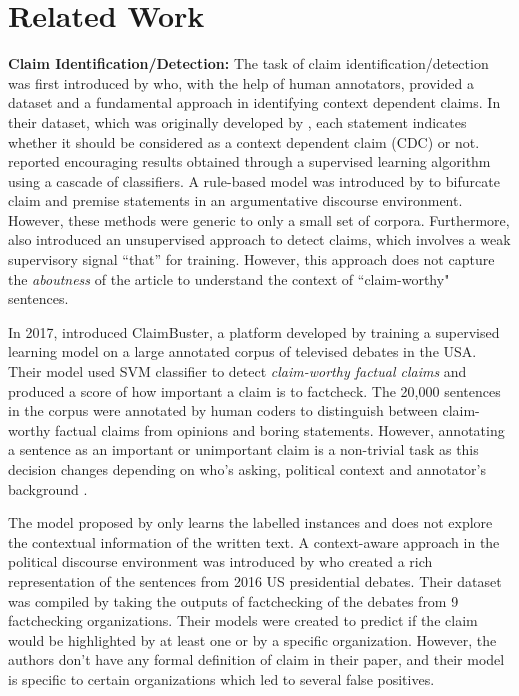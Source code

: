 \documentclass[11pt,a4paper]{article}
\begin{document}
 












\section{Related Work}
\label{sec:related}
{\textbf{Claim Identification/Detection:} The task of claim identification/detection was first introduced by \citet{levy_context_2014} who, with the help of human annotators, provided a dataset and a fundamental approach in identifying context dependent claims. In their dataset, which was originally developed by \citet{aharoni_benchmark_2014}, each statement indicates whether it should be considered as a context dependent claim (CDC) or not. \citet{levy_context_2014} reported encouraging results obtained through a supervised learning algorithm using a cascade of classifiers. A rule-based model was introduced by \citet{eckle-kohler_role_2015} to bifurcate claim and premise statements in an argumentative discourse environment. However, these methods were generic to only a small set of corpora. Furthermore, \citet{levy_unsupervised_2017} also introduced an unsupervised approach to detect claims, which involves a weak supervisory signal ``that'' for training. However, this approach does not capture the \textit{aboutness} of the article to understand the context of ``claim-worthy" sentences.
}

{
In 2017, \citet{hassan2017toward} introduced ClaimBuster, a platform developed by training a supervised learning model on a large annotated corpus of televised debates in the USA. Their model used SVM classifier to detect \textit{claim-worthy factual claims} and produced a score of how important a claim is to factcheck. The 20,000 sentences in the corpus were annotated by human coders to distinguish between claim-worthy factual claims from opinions and boring statements. However, annotating a sentence as an important or unimportant claim is a non-trivial task as this decision changes depending on who's asking, political context and annotator's background \cite{graves2018understanding}.}

{The model proposed by \citet{hassan2017toward} only learns the labelled instances and does not explore the contextual information of the written text. A context-aware approach in the political discourse environment was introduced by \citet{gencheva-etal-2017-context} who created a rich representation of the sentences from 2016 US presidential debates. Their dataset was compiled by taking the outputs of factchecking of the debates from 9 factchecking organizations. Their models were created to predict if the claim would be highlighted by at least one or by a specific organization. However, the authors don't have any formal definition of claim in their paper, and their model is specific to certain organizations which led to several false positives.}
\end{document}
